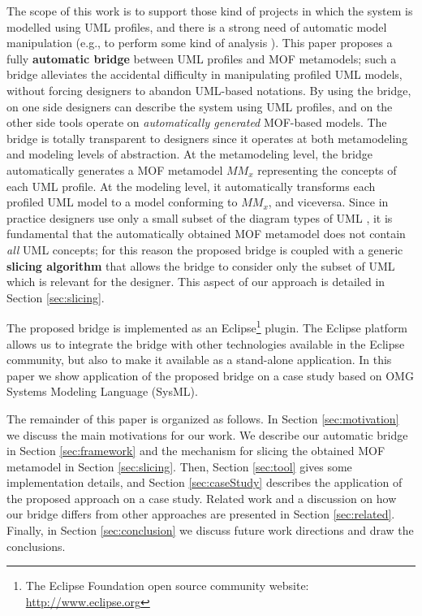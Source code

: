 The scope of this work is to support those kind of projects in which the system is modelled using UML profiles, and there is a strong need of automatic model manipulation (e.g., to perform some kind of analysis \cite{UMLprofilesAnalysis}).
This paper proposes a fully \textbf{automatic bridge} between UML profiles and MOF metamodels; such a bridge alleviates the accidental difficulty in manipulating profiled UML models, without forcing designers to abandon UML-based notations.
By using the bridge, on one side designers can describe the system using UML profiles, and on the other side tools operate
on \textit{automatically generated} MOF-based models.
The bridge is totally transparent to designers since it operates at both metamodeling and modeling levels of abstraction.
At the metamodeling level, the bridge automatically generates a MOF metamodel $MM_x$ representing the concepts of each UML profile.
At the modeling level, it automatically transforms each profiled UML model to a model conforming to $MM_x$, and viceversa.
Since in practice designers use only a small subset of the diagram types of UML \cite{france},
it is fundamental that the automatically obtained MOF metamodel does not contain \textit{all} UML concepts;
for this reason the proposed bridge is coupled with a generic \textbf{slicing algorithm} that allows the bridge to consider only the subset of UML which is relevant for the designer. This aspect of our approach is detailed in Section \ref{sec:slicing}.

The proposed bridge is implemented as an Eclipse\footnote{The Eclipse Foundation open source community website:
\small{\url{http://www.eclipse.org}}} plugin. The Eclipse platform allows us to integrate the bridge
with other technologies available in the Eclipse community, but also to make it available as a stand-alone application.
In this paper we show application of the proposed bridge on a case study based on OMG Systems Modeling Language (SysML).

The remainder of this paper is organized as follows. In Section \ref{sec:motivation} we discuss the main motivations for our work.
We describe our automatic bridge in Section \ref{sec:framework} and the mechanism for slicing the obtained MOF metamodel
in Section \ref{sec:slicing}.
Then, Section \ref{sec:tool} gives some implementation details, and Section \ref{sec:caseStudy} describes the application of
the proposed approach on a case study. Related work and a discussion on how our bridge differs from other approaches
are presented in Section \ref{sec:related}.
Finally, in Section \ref{sec:conclusion} we discuss future work directions and draw the conclusions.

















